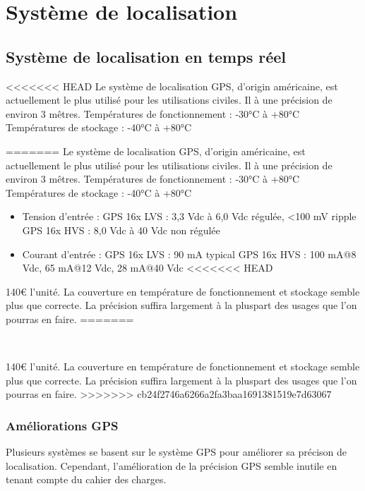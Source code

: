\section{Système de localisation}

    \subsection{Système de localisation en temps réel}
<<<<<<< HEAD
        { Le système de localisation GPS, d'origin américaine, est actuellement le plus utilisé pour les utilisations civiles.
          Il à une précision de environ 3 mêtres.}
        { Températures de fonctionnement : -30°C à +80°C\\
          Températures de stockage : -40°C à +80°C}
        { \begin{itemize}
=======
            {Le système de localisation GPS, d'origin américaine, est actuellement le plus utilisé pour les utilisations civiles.
            Il à une précision de environ 3 mêtres.}
            {Températures de fonctionnement : -30°C à +80°C\\
                      Températures de stockage : -40°C à +80°C}
            {\begin{itemize}
>>>>>>> cb24f2746a6266a2fa3baa1691381519e7d63067
                \item Tension d'entrée :
                    \subitem GPS 16x LVS : 3,3 Vdc à 6,0 Vdc régulée, <100 mV ripple
                    \subitem GPS 16x HVS : 8,0 Vdc à 40 Vdc non régulée
                \item Courant d'entrée :
                    \subitem GPS 16x LVS : 90 mA typical
                    \subitem GPS 16x HVS : 100 mA@8 Vdc, 65 mA@12 Vdc, 28 mA@40 Vdc
<<<<<<< HEAD
          \end{itemize}
        }
        { 140€ l'unité.
        }
        {}
        {La couverture en température de fonctionnement et stockage semble plus que correcte. La précision suffira largement à la pluspart des usages que l'on pourras en faire.}
=======
             \end{itemize}~}
            {140€ l'unité.}
            {}
            {La couverture en température de fonctionnement et stockage semble plus que correcte. La précision suffira largement à la pluspart des usages que l'on pourras en faire.}
>>>>>>> cb24f2746a6266a2fa3baa1691381519e7d63067
	        
	    \subsubsection{Améliorations GPS}
	        Plusieurs systèmes se basent sur le système GPS pour améliorer sa précison de localisation.
	        Cependant, l'amélioration de la précision GPS semble inutile en tenant compte du cahier des charges.

